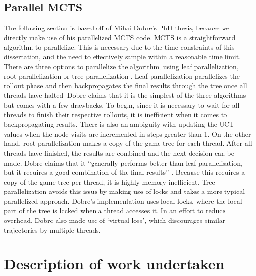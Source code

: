 \documentclass[msc, ai, logo, twoside, notimes, parskip, leftchapter, normalheadings]{infthesis}
\begin{document}
\section{Parallel MCTS}
The following section is based off of Mihai Dobre's PhD thesis, because we directly make use of his parallelized MCTS code. MCTS is a straightforward algorithm to parallelize. This is necessary due to the time constraints of this dissertation, and the need to effectively sample within a reasonable time limit. There are three options to parallelize the algorithm, using leaf parallelization, root parallelization or tree parallelization \citep{Mihai}. Leaf parallelization parallelizes the rollout phase and then backpropagates the final results through the tree once all threads have halted. Dobre claims that it is the simplest of the three algorithms but comes with a few drawbacks. To begin, since it is necessary to wait for all threads to finish their respective rollouts, it is inefficient when it comes to backpropagating results. There is also an ambiguity with updating the UCT values when the node visits are incremented in steps greater than 1. On the other hand, root parallelization makes a copy of the game tree for each thread. After all threads have finished, the results are combined and the next decision can be made. Dobre claims that it ``generally performs better than leaf parallelisation, but it requires a good combination of the final results'' \citep{Mihai}. Because this requires a copy of the game tree per thread, it is highly memory inefficient. Tree parallelization avoids this issue by making use of locks and takes a more typical parallelized approach. Dobre's implementation uses local locks, where the local part of the tree is locked when a thread accesses it. In an effort to reduce overhead, Dobre also made use of `virtual loss', which discourages similar trajectories by multiple threads.

\chapter{Description of work undertaken}
\end{document}
